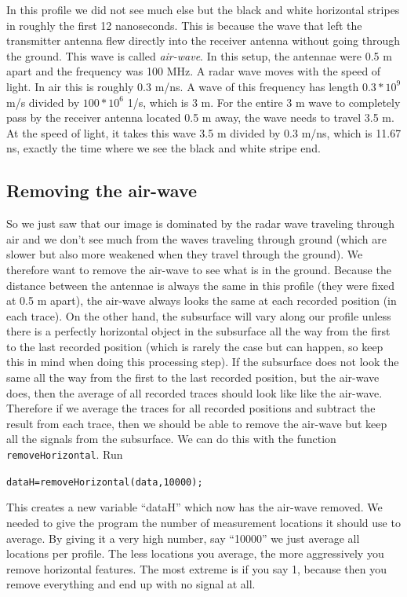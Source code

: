 \documentclass[11pt]{article}
\begin{document}
In this profile we did not see much else but the black and white
horizontal stripes in roughly the first 12 nanoseconds. This is
because the wave that left the transmitter antenna flew directly into
the receiver antenna without going through the ground. This wave is
called \emph{air-wave}. In this setup, the antennae were 0.5 m apart
and the frequency was 100 MHz. A radar wave moves with the speed of
light. In air this is roughly 0.3 m/ns. A wave of this frequency has
length $0.3*10^9$ m/s divided by $100*10^6$ 1/s, which is 3 m. For the
entire 3 m wave to completely pass by the receiver antenna located 0.5
m away, the wave needs to travel 3.5 m. At the speed of light, it takes this
wave 3.5 m divided by 0.3 m/ns, which is 11.67 ns, exactly the time
where we see the black and white stripe end.

\subsection{Removing the air-wave}

So we just saw that our image is dominated by the radar wave traveling
through air and we don't see much from the waves traveling through
ground (which are slower but also more weakened when they travel
through the ground). We therefore want to remove the air-wave to see
what is in the ground. Because the distance between the antennae is
always the same in this profile (they were fixed at 0.5 m apart), the
air-wave always looks the same at each recorded position (in each
trace). On the other hand, the subsurface will vary along our profile
unless there is a perfectly horizontal object in the subsurface all
the way from the first to the last recorded position (which is rarely
the case but can happen, so keep this in mind when doing this
processing step). If the subsurface does not look the same all the way
from the first to the last recorded position, but the air-wave does,
then the average of all recorded traces should look like like the
air-wave. Therefore if we average the traces for all recorded
positions and subtract the result from each trace, then we should be
able to remove the air-wave but keep all the signals from the
subsurface. We can do this with the function
\verb#removeHorizontal#. Run

\qquad\verb#dataH=removeHorizontal(data,10000);#

This creates a new variable ``dataH'' which now has the air-wave
removed. We needed to give the program the number of measurement
locations it should use to average. By giving it a very high number,
say ``10000'' we just average all locations per profile. The less
locations you average, the more aggressively you remove horizontal
features. The most extreme is if you say 1, because then you remove
everything and end up with no signal at all.
\end{document}

